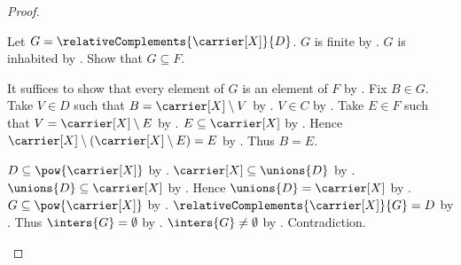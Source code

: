 \begin{proof}
\begin{subproof}
        Let $G=\relativeComplements{\carrier[X]}{D}$.
        $G$ is finite by .
        $G$ is inhabited by .
        Show that $G\subseteq F$.
        \begin{subproof}
            It suffices to show that every element of $G$ is an element of
                $F$ by .
            Fix $B\in G$.
            Take $V\in D$ such that $B=\carrier[X]\setminus V$
                by .
            $V\in C$ by .
            Take $E\in F$ such that $V=\carrier[X]\setminus E$
                by .
            $E\subseteq\carrier[X]$ by .
            Hence $\carrier[X]\setminus(\carrier[X]\setminus E)=E$
                by .
            Thus $B=E$.
        \end{subproof}
        $D\subseteq\pow{\carrier[X]}$
            by .
        $\carrier[X]\subseteq\unions{D}$
            by .
        $\unions{D}\subseteq\carrier[X]$
            by .
        Hence $\unions{D}=\carrier[X]$
            by .
        $G\subseteq\pow{\carrier[X]}$
            by .
        $\relativeComplements{\carrier[X]}{G}=D$
            by .
        Thus $\inters{G}=\emptyset$
            by .
        $\inters{G}\neq\emptyset$
            by .
        Contradiction.
    \end{subproof}


\end{proof}
